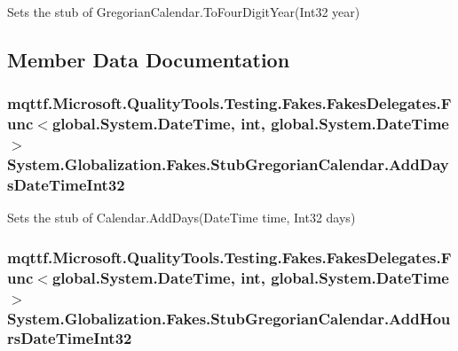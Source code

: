 Sets the stub of Gregorian\-Calendar.\-To\-Four\-Digit\-Year(\-Int32 year)



\subsection{Member Data Documentation}
\hypertarget{class_system_1_1_globalization_1_1_fakes_1_1_stub_gregorian_calendar_a2e01cb4a4080b9c3d63bd336ef9a64ca}{
\subsubsection[{Add\-Days\-Date\-Time\-Int32}]{\setlength{\rightskip}{0pt plus 5cm}mqttf.\-Microsoft.\-Quality\-Tools.\-Testing.\-Fakes.\-Fakes\-Delegates.\-Func$<$global.\-System.\-Date\-Time, int, global.\-System.\-Date\-Time$>$ System.\-Globalization.\-Fakes.\-Stub\-Gregorian\-Calendar.\-Add\-Days\-Date\-Time\-Int32}}\label{class_system_1_1_globalization_1_1_fakes_1_1_stub_gregorian_calendar_a2e01cb4a4080b9c3d63bd336ef9a64ca}


Sets the stub of Calendar.\-Add\-Days(\-Date\-Time time, Int32 days)

\hypertarget{class_system_1_1_globalization_1_1_fakes_1_1_stub_gregorian_calendar_ac57b7e925101366d5f8e5ec4c399f5d1}{
\subsubsection[{Add\-Hours\-Date\-Time\-Int32}]{\setlength{\rightskip}{0pt plus 5cm}mqttf.\-Microsoft.\-Quality\-Tools.\-Testing.\-Fakes.\-Fakes\-Delegates.\-Func$<$global.\-System.\-Date\-Time, int, global.\-System.\-Date\-Time$>$ System.\-Globalization.\-Fakes.\-Stub\-Gregorian\-Calendar.\-Add\-Hours\-Date\-Time\-Int32}}\label{class_system_1_1_globalization_1_1_fakes_1_1_stub_gregorian_calendar_ac57b7e925101366d5f8e5ec4c399f5d1}


